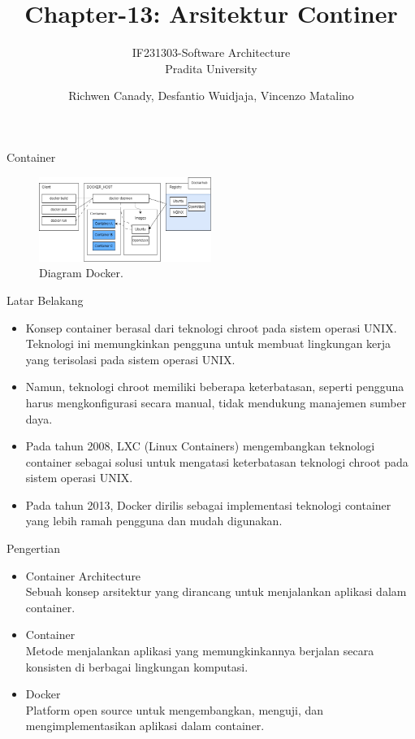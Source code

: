 \documentclass[aspectratio=169, table]{beamer}
\title{Chapter-13: Arsitektur Continer}
\subtitle{IF231303-Software Architecture\\Pradita University}
\author{Richwen Canady, Desfantio Wuidjaja, Vincenzo Matalino}
\begin{document}
	
	\begin{frame}[plain]
		\maketitle
	\end{frame}
	
	\begin{frame}{Container}
		\begin{figure}[h]
			\centering
			\includegraphics[width=0.5\textwidth]{DockerDiagram.png}
			\caption{Diagram Docker.}
			\label{fig:ContainerDiagram}
		\end{figure}
	\end{frame}
	
	\begin{frame}{Latar Belakang}
		\begin{itemize}
			\item Konsep container berasal dari teknologi chroot pada sistem operasi UNIX. Teknologi ini memungkinkan pengguna untuk membuat lingkungan kerja yang terisolasi pada sistem operasi UNIX.
			\item Namun, teknologi chroot memiliki beberapa keterbatasan, seperti pengguna harus mengkonfigurasi secara manual, tidak mendukung manajemen sumber daya.
			\item Pada tahun 2008, LXC (Linux Containers) mengembangkan teknologi container sebagai solusi untuk mengatasi keterbatasan teknologi chroot pada sistem operasi UNIX.
			\item Pada tahun 2013, Docker dirilis sebagai implementasi teknologi container yang lebih ramah pengguna dan mudah digunakan.
		\end{itemize}
	\end{frame}
	
	\begin{frame}{Pengertian}
		\begin{itemize}
			\item Container Architecture
			\\Sebuah konsep arsitektur yang dirancang untuk menjalankan aplikasi dalam container.
			\item Container
			\\Metode menjalankan aplikasi yang memungkinkannya berjalan secara konsisten di berbagai lingkungan komputasi.
			\item Docker
			\\Platform open source untuk mengembangkan, menguji, dan mengimplementasikan aplikasi dalam container. 
		\end{itemize}
	\end{frame}
	
\end{document}
